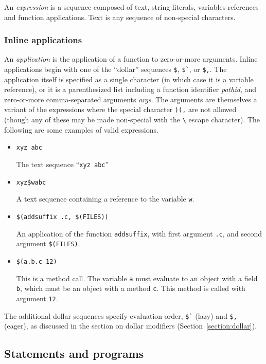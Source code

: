 An \emph{expression} is a sequence composed of text, string-literals, variables references and
function applications.  Text is any sequence of non-special characters.

\subsubsection{Inline applications}

An \emph{application} is the application of a function to zero-or-more arguments.  Inline
applications begin with one of the ``dollar'' sequences \verb+$+, \verb+$`+, or \verb+$,+.  The
application itself is specified as a single character (in which case it is a variable reference), or
it is a parenthesized list including a function identifier \emph{pathid}, and zero-or-more
comma-separated arguments \emph{args}.  The arguments are themselves a variant of the expressions
where the special character \verb+)(,+ are not allowed (though any of these may be made non-special
with the \verb+\+ escape character).  The following are some examples of valid expressions.

\begin{itemize}
\item \verb+xyz abc+

The text sequence ``\verb+xyz abc+''

\item \verb+xyz$wabc+

A text sequence containing a reference to the variable \verb+w+.

\item \verb+$(addsuffix .c, $(FILES))+

An application of the function \verb+addsuffix+, with first argument \verb+.c+, and second argument \verb+$(FILES)+.

\item \verb+$(a.b.c 12)+

This is a method call.  The variable \verb+a+ must evaluate to an object with a field \verb+b+,
which must be an object with a method \verb+c+.  This method is called with argument \verb+12+.
\end{itemize}

The additional dollar sequences specify evaluation order, \verb+$`+ (lazy) and \verb+$,+ (eager), as
discussed in the section on dollar modifiers (Section~\ref{section:dollar}).

\subsection{Statements and programs}

